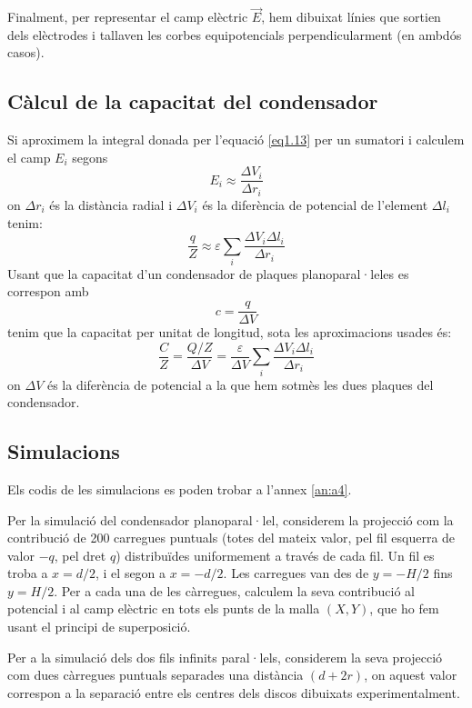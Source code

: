 \documentclass[a4paper,10.5pt]{report}
\begin{document}
Finalment, per representar el camp elèctric $\vec{E}$, hem dibuixat línies que sortien dels elèctrodes i tallaven les corbes equipotencials perpendicularment (en ambdós casos). 

\subsection{Càlcul de la capacitat del condensador}
Si aproximem la integral donada per l'equació \eqref{eq1.13} per un sumatori i calculem el camp $E_i$ segons
\begin{equation}
	E_i \approx \frac{\Delta V_i}{\Delta r_i} \label{eq1.14}
\end{equation}
on $\Delta r_i$ és la distància radial i $\Delta V_i$ és la diferència de potencial de l'element $\Delta l_i$ tenim:
\begin{equation}
	\frac{q}{Z} \approx \varepsilon \sum_i \frac{\Delta V_i \Delta l_i}{\Delta r_i}
\end{equation}
Usant que la capacitat d'un condensador de plaques planoparal·leles es correspon amb 
\begin{equation}
	c = \frac{q}{\Delta V}
\end{equation}
tenim que la capacitat per unitat de longitud, sota les aproximacions usades és:
\begin{equation}
	\frac{C}{Z} = \frac{Q/Z}{\Delta V} = \frac{\varepsilon}{\Delta V} \sum_i \frac{\Delta V_i \Delta l_i}{\Delta r_i} \label{eq1.17}
\end{equation}
on $\Delta V$ és la diferència de potencial a la que hem sotmès les dues plaques del condensador.

\subsection{Simulacions}
Els codis de les simulacions es poden trobar a l'annex \ref{an:a4}.

Per la simulació del condensador planoparal·lel, considerem la projecció com la contribució de 200 carregues puntuals (totes del mateix valor, pel fil esquerra de valor $-q$, pel dret $q$) distribuïdes uniformement a través de cada fil. Un fil es troba a $x = d/2$, i el segon a $x = - d/2$. Les carregues van des de $y = -H/2$ fins $y = H/2$. Per a cada una de les càrregues, calculem la seva contribució al potencial i al camp elèctric en tots els punts de la malla $(X, Y)$, que ho fem usant el principi de superposició.

Per a la simulació dels dos fils infinits paral·lels, considerem la seva projecció com dues càrregues puntuals separades una distància $(d+2r)$, on aquest valor correspon a la separació entre els centres dels discos dibuixats experimentalment.
\end{document}
